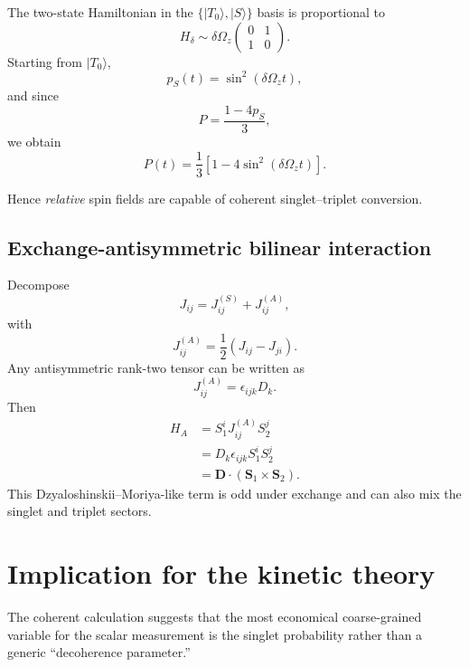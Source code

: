 \documentclass[11pt]{article}
\newcommand{\eps}{\epsilon}
\begin{document}
The two-state Hamiltonian in the $\{|T_0\rangle,|S\rangle\}$ basis is proportional to
\begin{equation}
H_\delta
\sim
\delta\Omega_z
\begin{pmatrix}
0&1\\
1&0
\end{pmatrix}.
\end{equation}
Starting from $|T_0\rangle$,
\begin{equation}
p_S(t)=\sin^2(\delta\Omega_z t),
\end{equation}
and since
\begin{equation}
P=\frac{1-4p_S}{3},
\end{equation}
we obtain
\begin{equation}
\boxed{
P(t)
=
\frac13
\left[
1-4\sin^2(\delta\Omega_z t)
\right].
}
\label{eq:osc}
\end{equation}

Hence \emph{relative} spin fields are capable of coherent singlet--triplet conversion.

\subsection{Exchange-antisymmetric bilinear interaction}

Decompose
\begin{equation}
J_{ij}
=
J^{(S)}_{ij}
+
J^{(A)}_{ij},
\end{equation}
with
\begin{equation}
J^{(A)}_{ij}
=
\frac12(J_{ij}-J_{ji}).
\end{equation}
Any antisymmetric rank-two tensor can be written as
\begin{equation}
J^{(A)}_{ij}
=
\eps_{ijk}D_k.
\end{equation}
Then
\begin{align}
H_A
&=
S_1^iJ^{(A)}_{ij}S_2^j\\
&=
D_k\eps_{ijk}S_1^iS_2^j\\
&=
\boxed{
\bm D\cdot(\bm S_1\times\bm S_2)
}.
\end{align}
This Dzyaloshinskii--Moriya-like term is odd under exchange and can also mix the singlet and triplet
sectors.

\section{Implication for the kinetic theory}

The coherent calculation suggests that the most economical coarse-grained variable for the scalar
measurement is the singlet probability rather than a generic ``decoherence parameter.''
\end{document}
